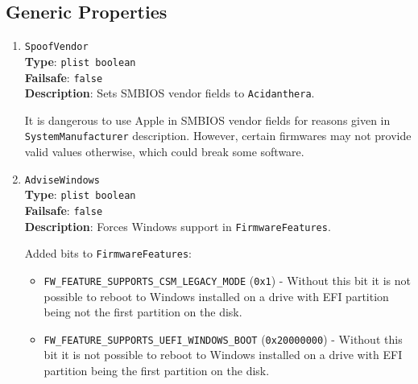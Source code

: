 \documentclass[]{article}
\begin{document}
\subsection{Generic Properties}\label{platforminfogeneric}

\begin{enumerate}
\item
  \texttt{SpoofVendor}\\
  \textbf{Type}: \texttt{plist\ boolean}\\
  \textbf{Failsafe}: \texttt{false}\\
  \textbf{Description}: Sets SMBIOS vendor fields to \texttt{Acidanthera}.

  It is dangerous to use Apple in SMBIOS vendor fields for reasons given
  in \texttt{SystemManufacturer} description. However, certain firmwares
  may not provide valid values otherwise, which could break some software.

\item
  \texttt{AdviseWindows}\\
  \textbf{Type}: \texttt{plist\ boolean}\\
  \textbf{Failsafe}: \texttt{false}\\
  \textbf{Description}: Forces Windows support in \texttt{FirmwareFeatures}.

  Added bits to \texttt{FirmwareFeatures}:

  \begin{itemize}
    \item \texttt{FW\_FEATURE\_SUPPORTS\_CSM\_LEGACY\_MODE} (\texttt{0x1})
    - Without this bit it is not possible to reboot to Windows installed on
      a drive with EFI partition being not the first partition on the disk.
    \item \texttt{FW\_FEATURE\_SUPPORTS\_UEFI\_WINDOWS\_BOOT} (\texttt{0x20000000})
    - Without this bit it is not possible to reboot to Windows installed on
      a drive with EFI partition being the first partition on the disk.
  \end{itemize}


\end{enumerate}
\end{document}
